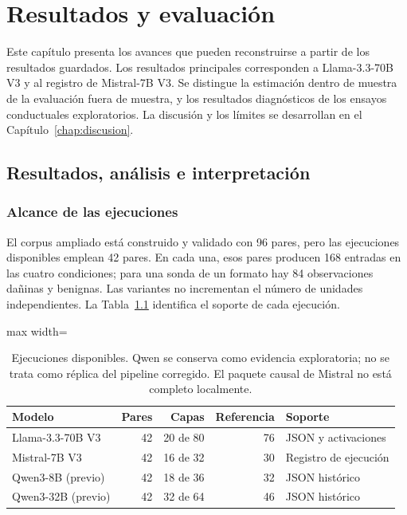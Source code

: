 \chapter{Resultados y evaluación}
\label{chap:resultados-evaluacion}

Este capítulo presenta los avances que pueden reconstruirse a partir de los resultados guardados. Los resultados principales corresponden a Llama-3.3-70B V3 y al registro de Mistral-7B V3. Se distingue la estimación dentro de muestra de la evaluación fuera de muestra, y los resultados diagnósticos de los ensayos conductuales exploratorios. La discusión y los límites se desarrollan en el Capítulo~\ref{chap:discusion}.

\section{Resultados, análisis e interpretación}
\label{sec:resultados}
\subsection{Alcance de las ejecuciones}

El corpus ampliado está construido y validado con 96 pares, pero las ejecuciones disponibles emplean 42 pares. En cada una, esos pares producen 168 entradas en las cuatro condiciones; para una sonda de un formato hay 84 observaciones dañinas y benignas. Las variantes no incrementan el número de unidades independientes. La Tabla~\ref{tab:corridas} identifica el soporte de cada ejecución.
\begin{table}[htbp]\centering\small
\begin{adjustbox}{max width=\textwidth}
\begin{tabular}{@{}lrrrl@{}}\toprule
Modelo & Pares & Capas & Referencia & Soporte \\\midrule
Llama-3.3-70B V3 & 42 & 20 de 80 & 76 & JSON y activaciones \\
Mistral-7B V3 & 42 & 16 de 32 & 30 & Registro de ejecución \\
Qwen3-8B (previo) & 42 & 18 de 36 & 32 & JSON histórico \\
Qwen3-32B (previo) & 42 & 32 de 64 & 46 & JSON histórico \\
\bottomrule\end{tabular}\end{adjustbox}
\caption{Ejecuciones disponibles. Qwen se conserva como evidencia exploratoria; no se trata como réplica del pipeline corregido. El paquete causal de Mistral no está completo localmente.}\label{tab:corridas}\end{table}

